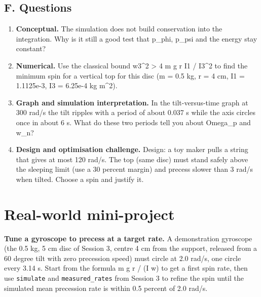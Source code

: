 \documentclass[11pt,a4paper]{article}
\begin{document}
\subsection*{F. Questions}
\begin{enumerate}[nosep]
\item \textbf{Conceptual.} The simulation does not build conservation into the integration. Why is it still a good test that p\_phi, p\_psi and the energy stay constant?
\item \textbf{Numerical.} Use the classical bound w3\textasciicircum{}2 \textgreater{} 4 m g r I1 / I3\textasciicircum{}2 to find the minimum spin for a vertical top for this disc (m = 0.5 kg, r = 4 cm, I1 = 1.1125e-3, I3 = 6.25e-4 kg m\textasciicircum{}2).
\item \textbf{Graph and simulation interpretation.} In the tilt-versus-time graph at 300 rad/s the tilt ripples with a period of about 0.037 s while the axis circles once in about 6 s. What do these two periods tell you about Omega\_p and w\_n?
\item \textbf{Design and optimisation challenge.} Design: a toy maker pulls a string that gives at most 120 rad/s. The top (same disc) must stand safely above the sleeping limit (use a 30 percent margin) and precess slower than 3 rad/s when tilted. Choose a spin and justify it.
\end{enumerate}

\section{Real-world mini-project}
\textbf{Tune a gyroscope to precess at a target rate.} A demonstration gyroscope (the 0.5 kg, 5 cm disc of Session 3, centre 4 cm from the support, released from a 60 degree tilt with zero precession speed) must circle at 2.0 rad/s, one circle every 3.14 s. Start from the formula m g r / (I w) to get a first spin rate, then use \texttt{simulate} and \texttt{measured\_rates} from Session 3 to refine the spin until the simulated mean precession rate is within 0.5 percent of 2.0 rad/s.
\end{document}
